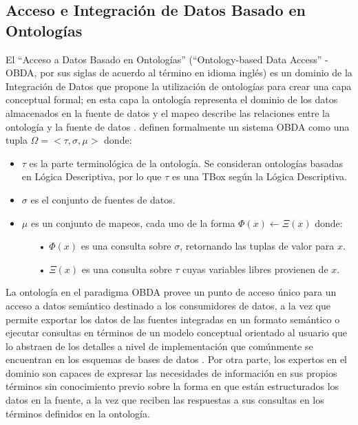 \subsection{Acceso e Integración de Datos Basado en Ontologías}
El ``Acceso a Datos Basado en Ontologías'' (``Ontology-based Data Access'' - OBDA, por sus siglas de acuerdo al término en idioma inglés) es un dominio de la Integración de Datos que propone la utilización de ontologías para crear una capa conceptual formal; en esta capa la ontología representa el dominio de los datos almacenados en la fuente de datos y el mapeo describe las relaciones entre la ontología y la fuente de datos \citep{Calvanese:2015:SOY:2991147.2991152,KHARLAMOV20173}. \cite{Tabares-Martin2016} definen formalmente un sistema OBDA como una tupla \( \Omega = <\tau,\sigma,\mu> \) donde:

\begin{itemize}
 	\item \(\tau\) es la parte terminológica de la ontología. Se consideran ontologías basadas en Lógica Descriptiva, por lo que $\tau$ es una TBox según la Lógica Descriptiva.
 	\item $\sigma$ es el conjunto de fuentes de datos.
 	\item $\mu$ es un conjunto de mapeos, cada uno de la forma $\Phi(x) \leftarrow \Xi(x)$ donde:
 	\begin{itemize}
 		\item[•] $\Phi(x)$ es una consulta sobre $\sigma$, retornando las tuplas de valor para $x$.
 		\item[•] $\Xi(x)$ es una consulta sobre $\tau$ cuyas variables libres provienen de $x$.
 	\end{itemize}
\end{itemize}

La ontología en el paradigma OBDA provee un punto de acceso único para un acceso a datos semántico destinado a los consumidores de datos, a la vez que permite exportar los datos de las fuentes integradas en un formato semántico o ejecutar consultas en términos de un modelo conceptual orientado al usuario que lo abstraen de los detalles a nivel de implementación que comúnmente se encuentran en los esquemas de bases de datos \citep{KHARLAMOV20173}. Por otra parte, los expertos en el dominio son capaces de expresar las necesidades de información en sus propios términos sin conocimiento previo sobre la forma en que están estructurados los datos en la fuente, a la vez que reciben las respuestas a sus consultas en los términos definidos en la ontología.


